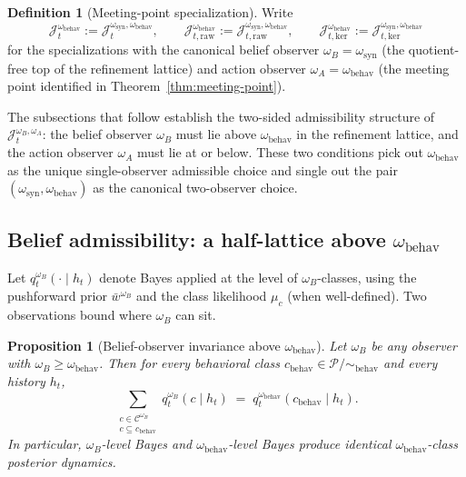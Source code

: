 \documentclass[11pt]{article}
\newtheorem{proposition}[theorem]{Proposition}
\theoremstyle{definition}
\newtheorem{definition}[theorem]{Definition}
\theoremstyle{remark}
\newcommand{\Ccal}{\mathcal{C}}
\newcommand{\Pcal}{\mathcal{P}}
\begin{document}
\begin{definition}[Meeting-point specialization]
\label{def:meeting-point-shorthand}
Write
\[
\mathcal J_t^{\omega_{\mathrm{behav}}}:=\mathcal J_t^{\omega_{\mathrm{syn}},\omega_{\mathrm{behav}}},
\qquad
\mathcal J_{t,\mathrm{raw}}^{\omega_{\mathrm{behav}}}:=\mathcal J_{t,\mathrm{raw}}^{\omega_{\mathrm{syn}},\omega_{\mathrm{behav}}},
\qquad
\mathcal J_{t,\mathrm{ker}}^{\omega_{\mathrm{behav}}}:=\mathcal J_{t,\mathrm{ker}}^{\omega_{\mathrm{syn}},\omega_{\mathrm{behav}}}
\]
for the specializations with the canonical belief observer $\omega_B=\omega_{\mathrm{syn}}$ (the quotient-free top of the refinement lattice) and action observer $\omega_A=\omega_{\mathrm{behav}}$ (the meeting point identified in Theorem~\ref{thm:meeting-point}).
\end{definition}

The subsections that follow establish the two-sided admissibility structure of $\mathcal J_t^{\omega_B,\omega_A}$: the belief observer $\omega_B$ must lie above $\omega_{\mathrm{behav}}$ in the refinement lattice, and the action observer $\omega_A$ must lie at or below. These two conditions pick out $\omega_{\mathrm{behav}}$ as the unique single-observer admissible choice and single out the pair $(\omega_{\mathrm{syn}},\omega_{\mathrm{behav}})$ as the canonical two-observer choice.

\subsection{Belief admissibility: a half-lattice above $\omega_{\mathrm{behav}}$}
\label{sec:belief-admissibility}

Let $q_t^{\omega_B}(\cdot\mid h_t)$ denote Bayes applied at the level of $\omega_B$-classes, using the pushforward prior $\bar w^{\omega_B}$ and the class likelihood $\mu_c$ (when well-defined). Two observations bound where $\omega_B$ can sit.

\begin{proposition}[Belief-observer invariance above $\omega_{\mathrm{behav}}$]
\label{prop:belief-invariance-above}
Let $\omega_B$ be any observer with $\omega_B\ge\omega_{\mathrm{behav}}$. Then for every behavioral class $c_{\mathrm{behav}}\in\Pcal/\!\sim_{\mathrm{behav}}$ and every history $h_t$,
\[
\sum_{\substack{c\in\Ccal^{\omega_B}\\ c\subseteq c_{\mathrm{behav}}}}q_t^{\omega_B}(c\mid h_t)\;=\;q_t^{\omega_{\mathrm{behav}}}(c_{\mathrm{behav}}\mid h_t).
\]
In particular, $\omega_B$-level Bayes and $\omega_{\mathrm{behav}}$-level Bayes produce identical $\omega_{\mathrm{behav}}$-class posterior dynamics.
\end{proposition}
\end{document}
